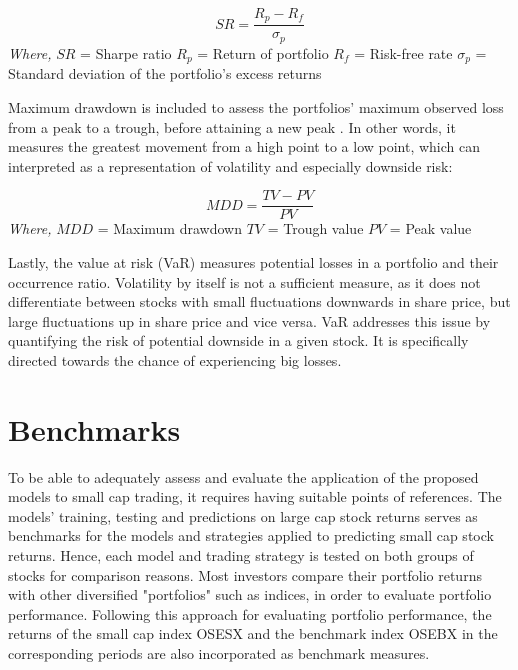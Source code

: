 \indent \newline
\begin{equation}
SR = \frac{R_{p} - R_{f}}{\sigma_{p}}
\end{equation}
\indent \newline 
\textit{Where,}
\indent \newline 
$SR$ = Sharpe ratio
\indent \newline 
$R_{p}$ = Return of portfolio
\indent \newline 
$R_{f}$ = Risk-free rate
\indent \newline 
$\sigma_{p}$ = Standard deviation of the portfolio's excess returns

\indent \newline 
Maximum drawdown is included to assess the portfolios' maximum observed loss from a peak to a trough, before attaining a new peak \cite{hayes}. In other words, it measures the greatest movement from a high point to a low point, which can interpreted as a representation of volatility and especially downside risk:

\indent \newline
\begin{equation}
MDD = \frac{TV - PV}{PV}
\end{equation}
\indent \newline 
\textit{Where,}
\indent \newline 
$MDD$ = Maximum drawdown
\indent \newline 
$TV$ = Trough value
\indent \newline 
$PV$ = Peak value

\indent \newline
Lastly, the value at risk (VaR) measures potential losses in a portfolio and their occurrence ratio. Volatility by itself is not a sufficient measure, as it does not differentiate between stocks with small fluctuations downwards in share price, but large fluctuations up in share price and vice versa. VaR addresses this issue by quantifying the risk of potential downside in a given stock. It is specifically directed towards the chance of experiencing big losses.  

\section{Benchmarks}
To be able to adequately assess and evaluate the application of the proposed models to small cap trading, it requires having suitable points of references. The models' training, testing and predictions on large cap stock returns serves as benchmarks for the models and strategies applied to predicting small cap stock returns. Hence, each model and trading strategy is tested on both groups of stocks for comparison reasons. Most investors compare their portfolio returns with other diversified "portfolios" such as indices, in order to evaluate portfolio performance. Following this approach for evaluating portfolio performance, the returns of the small cap index OSESX and the benchmark index OSEBX in the corresponding periods are also incorporated as benchmark measures.  

